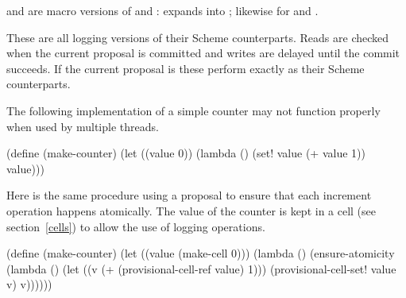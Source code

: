 and  are macro versions of
 and :
 expands into
; likewise for
 and .

\begin{protos}
\end{protos}
\noindent
These are all logging versions of their Scheme counterparts.
Reads are checked when the current proposal is committed and writes are
 delayed until the commit succeeds.
If the current proposal is  these perform exactly as their Scheme
 counterparts.

The following implementation of a simple counter may not function properly
 when used by multiple threads.
\begin{example}
(define (make-counter)
  (let ((value 0))
    (lambda ()
      (set! value (+ value 1))
      value)))
\end{example}

Here is the same procedure using a proposal to ensure that each
 increment operation happens atomically.
The value of the counter is kept in a
cell (see section~\ref{cells})
 to allow the use of
 logging operations.
\begin{example}
(define (make-counter)
  (let ((value (make-cell 0)))
    (lambda ()
      (ensure-atomicity
        (lambda ()
          (let ((v (+ (provisional-cell-ref value)
                      1)))
            (provisional-cell-set! value v)
            v))))))
\end{example}

